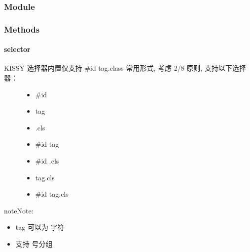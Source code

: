 \documentclass[letterpaper,10pt,english]{sphinxmanual}
\begin{document}
\subsubsection{Module}
\label{api/core/dom/index:module}\begin{quote}

{\hyperref[api/core/dom/index:module-DOM]{}}
\end{quote}


\subsubsection{Methods}
\label{api/core/dom/index:methods}

\paragraph{selector}
\label{api/core/dom/selector:dom-selector}\label{api/core/dom/selector::doc}\label{api/core/dom/selector:selector}\begin{description}
\item[{KISSY 选择器内置仅支持 \#id tag.class 常用形式, 考虑 2/8 原则, 支持以下选择器：}] \leavevmode\begin{itemize}
\item {}
\#id

\item {}
tag

\item {}
.cls

\item {}
\#id tag

\item {}
\#id .cls

\item {}
tag.cls

\item {}
\#id tag.cls

\end{itemize}

\end{description}

\begin{notice}{note}{Note:}\begin{itemize}
\item {}
tag 可以为 \code{*} 字符

\item {}
支持 \code{,} 号分组

\end{itemize}
\end{notice}
\end{document}
